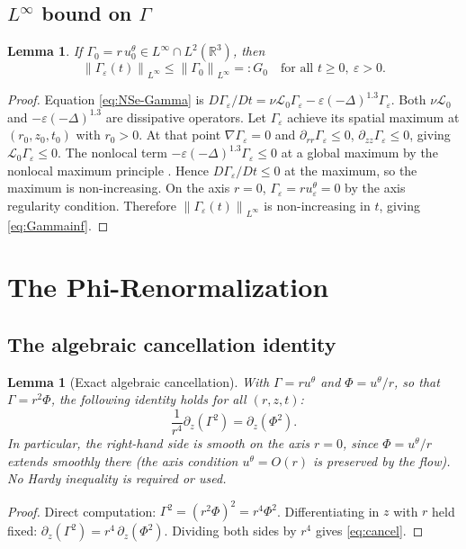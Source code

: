 \documentclass{article}
\newtheorem{lemma}[theorem]{Lemma}
\theoremstyle{definition}
\theoremstyle{remark}
\newcommand{\R}{\mathbb{R}}
\newcommand{\e}{\varepsilon}
\newcommand{\Lc}{\mathcal{L}}
\newcommand{\norm}[1]{\left\|#1\right\|}
\begin{document}
\subsection{\texorpdfstring{$L^\infty$}{L-infty} bound on
  \texorpdfstring{$\Gamma$}{Gamma}}

\begin{lemma}\label{lem:Gamma}
  If $\Gamma_0 = r\,u_0^\theta \in L^\infty\cap L^2(\R^3)$, then
  \begin{equation}\label{eq:Gammainf}
    \norm{\Gamma_\e(t)}_{L^\infty} \le \norm{\Gamma_0}_{L^\infty}
    =: G_0
    \quad\text{for all } t\ge 0,\ \e > 0.
  \end{equation}
\end{lemma}
\begin{proof}
  Equation \eqref{eq:NSe-Gamma} is
  $D\Gamma_\e/Dt = \nu\Lc_0\Gamma_\e - \e(-\Delta)^{1.3}\Gamma_\e$.
  Both $\nu\Lc_0$ and $-\e(-\Delta)^{1.3}$ are dissipative operators.
  Let $\Gamma_\e$ achieve its spatial maximum at $(r_0,z_0,t_0)$ with
  $r_0 > 0$.  At that point $\nabla\Gamma_\e = 0$ and
  $\partial_{rr}\Gamma_\e \le 0$, $\partial_{zz}\Gamma_\e \le 0$,
  giving $\Lc_0\Gamma_\e \le 0$.  The nonlocal term
  $-\e(-\Delta)^{1.3}\Gamma_\e \le 0$ at a global maximum by the
  nonlocal maximum principle \cite{Stinga2010}.  Hence $D\Gamma_\e/Dt \le 0$
  at the maximum, so the maximum is non-increasing.  On the axis $r=0$,
  $\Gamma_\e = r u_\e^\theta = 0$ by the axis regularity condition.
  Therefore $\norm{\Gamma_\e(t)}_{L^\infty}$ is non-increasing in $t$,
  giving \eqref{eq:Gammainf}.
\end{proof}

\section{The Phi-Renormalization}\label{sec:phi}

\subsection{The algebraic cancellation identity}

\begin{lemma}[Exact algebraic cancellation]\label{lem:cancel}
  With $\Gamma = r u^\theta$ and $\Phi = u^\theta/r$, so that
  $\Gamma = r^2\Phi$, the following identity holds for all $(r,z,t)$:
  \begin{equation}\label{eq:cancel}
    \frac{1}{r^4}\partial_z(\Gamma^2) = \partial_z(\Phi^2).
  \end{equation}
  In particular, the right-hand side is smooth on the axis $r=0$,
  since $\Phi = u^\theta/r$ extends smoothly there (the axis condition
  $u^\theta = O(r)$ is preserved by the flow).
  No Hardy inequality is required or used.
\end{lemma}
\begin{proof}
  Direct computation:  $\Gamma^2 = (r^2\Phi)^2 = r^4\Phi^2$.
  Differentiating in $z$ with $r$ held fixed:
  $\partial_z(\Gamma^2) = r^4\,\partial_z(\Phi^2)$.
  Dividing both sides by $r^4$ gives \eqref{eq:cancel}.
\end{proof}
\end{document}
